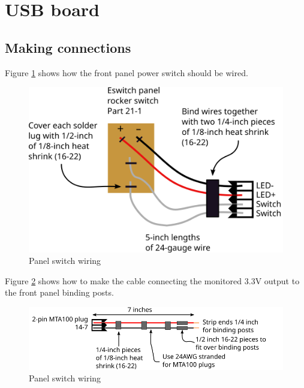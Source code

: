 \section{USB board}

\subsection{Making connections}
Figure \ref{fig:panel_switch_wiring} shows how the front panel power
switch should be wired.

\begin{figure}[ht]
  \begin{center}
    \includegraphics[clip,scale=1]{figs/panel_switch_wiring}
    \caption{Panel switch wiring \label{fig:panel_switch_wiring}}
  \end{center}
\end{figure}

Figure \ref{fig:post_cable} shows how to make the cable connecting the
monitored 3.3V output to the front panel binding posts.
\begin{figure}[ht]
  \begin{center}
    \includegraphics[clip,scale=1]{figs/post_cable}
    \caption{Panel switch wiring \label{fig:post_cable}}
  \end{center}
\end{figure}


